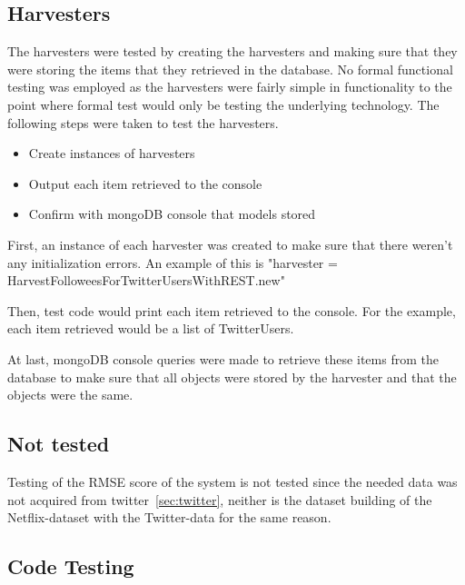 \subsection{Harvesters}
The harvesters were tested by creating the harvesters and making sure that they were storing the items that they retrieved in the database. No formal functional testing was employed as the harvesters were fairly simple in functionality to the point where formal test would only be testing the underlying technology. The following steps were taken to test the harvesters.

	\begin{itemize}
	\item Create instances of harvesters
	\item Output each item retrieved to the console
	\item Confirm with mongoDB console that models stored
	\end{itemize}

First, an instance of each harvester was created to make sure that there weren't any initialization errors. An example of this is "harvester = HarvestFolloweesForTwitterUsersWithREST.new"

Then, test code would print each item retrieved to the console. For the example, each item retrieved would be a list of TwitterUsers.

At last, mongoDB console queries were made to retrieve these items from the database to make sure that all objects were stored by the harvester and that the objects were the same.

\subsection{Not tested}
Testing of the RMSE score of the system is not tested since the needed data was not acquired from twitter~\ref{sec:twitter}, neither is the dataset building of the Netflix-dataset with the Twitter-data for the same reason.

\subsection{Code Testing}

